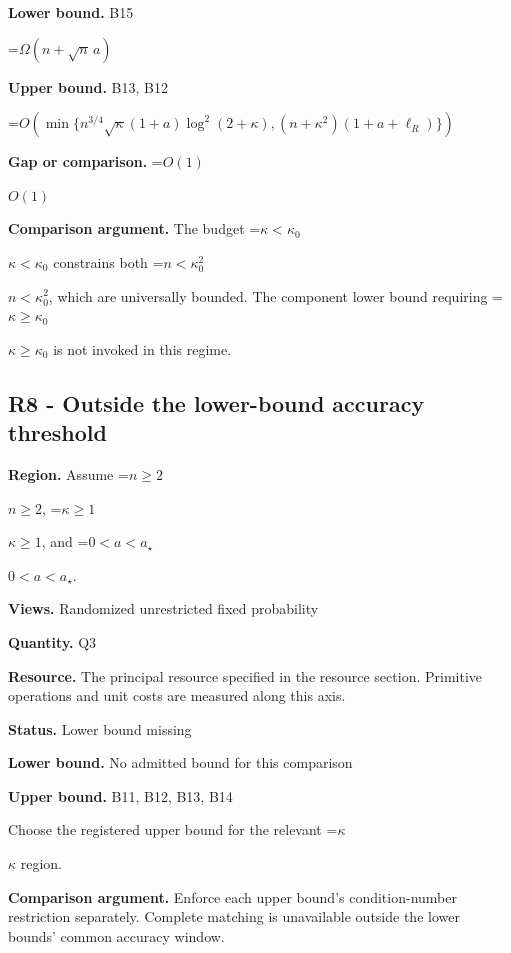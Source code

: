 \documentclass[10pt,a4paper]{article}
\newcommand{\AtlasMath}[1]{\par\begingroup\centering\setbox0=\hbox{$\displaystyle #1$}\ifdim\wd0>1.4\linewidth\typeout{ATLAS WIDE FORMULA: \the\wd0}\fi\ifdim\wd0>\linewidth\resizebox{\linewidth}{!}{\box0}\else\box0\fi\par\endgroup}
\newcommand{\AtlasInlineMath}[1]{\begingroup\setbox0=\hbox{$#1$}\ifdim\wd0>.4\linewidth\endgroup\AtlasMath{#1}\else\endgroup$#1$\fi}
\begin{document}
\textbf{Lower bound.} B15



\AtlasMath{\Omega(n+\sqrt n\,a)}


\textbf{Upper bound.} B13, B12



\AtlasMath{O\!\left(\min\{n^{3/4}\sqrt\kappa(1+a)\log^2(2+\kappa),(n+\kappa^2)(1+a+\ell_R)\}\right)}


\textbf{Gap or comparison.} \AtlasInlineMath{O(1)}



\textbf{Comparison argument.} The budget \AtlasInlineMath{\kappa<\kappa_0} constrains both \AtlasInlineMath{n<\kappa_0^2}, which are universally bounded. The component lower bound requiring \AtlasInlineMath{\kappa\ge\kappa_0} is not invoked in this regime.



\subsection{R8 - Outside the lower-bound accuracy threshold}


\textbf{Region.} Assume \AtlasInlineMath{n\ge2}, \AtlasInlineMath{\kappa\ge1}, and \AtlasInlineMath{0<a<a_\star}.



\textbf{Views.} Randomized unrestricted fixed probability



\textbf{Quantity.} Q3



\textbf{Resource.} The principal resource specified in the resource section. Primitive operations and unit costs are measured along this axis.



\textbf{Status.} Lower bound missing



\textbf{Lower bound.} No admitted bound for this comparison



\textbf{Upper bound.} B11, B12, B13, B14



Choose the registered upper bound for the relevant \AtlasInlineMath{\kappa} region.



\textbf{Comparison argument.} Enforce each upper bound's condition-number restriction separately. Complete matching is unavailable outside the lower bounds' common accuracy window.
\end{document}
